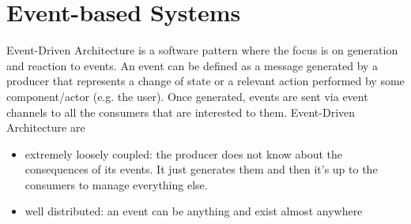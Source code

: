 \documentclass[11pt,a4paper,notitlepage]{article}
\begin{document}
\section{Event-based Systems}
Event-Driven Architecture is a software pattern where the focus is on generation and reaction to events. An event can be defined as a message generated by a producer that represents a change of state or a relevant action performed by some component/actor (e.g. the user). Once generated, events are sent via event channels to all the consumers that are interested to them. Event-Driven Architecture are
\begin{itemize}
	\item extremely loosely coupled: the producer does not know about the consequences of its events. It just generates them and then it's up to the consumers to manage everything else.
	\item well distributed: an event can be anything and exist almost anywhere
\end{itemize}
\end{document}

